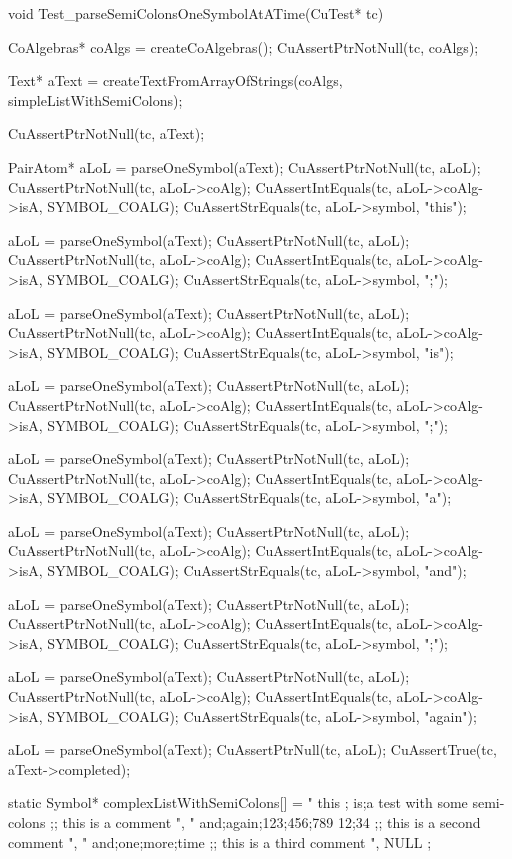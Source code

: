 void Test_parseSemiColonsOneSymbolAtATime(CuTest* tc) {
  CoAlgebras* coAlgs = createCoAlgebras();
  CuAssertPtrNotNull(tc, coAlgs);

  Text* aText =
    createTextFromArrayOfStrings(coAlgs, simpleListWithSemiColons);

  CuAssertPtrNotNull(tc, aText);

  PairAtom* aLoL = parseOneSymbol(aText);
  CuAssertPtrNotNull(tc, aLoL);
  CuAssertPtrNotNull(tc, aLoL->coAlg);
  CuAssertIntEquals(tc, aLoL->coAlg->isA, SYMBOL_COALG);
  CuAssertStrEquals(tc, aLoL->symbol, "this");

  aLoL = parseOneSymbol(aText);
  CuAssertPtrNotNull(tc, aLoL);
  CuAssertPtrNotNull(tc, aLoL->coAlg);
  CuAssertIntEquals(tc, aLoL->coAlg->isA, SYMBOL_COALG);
  CuAssertStrEquals(tc, aLoL->symbol, ";");

  aLoL = parseOneSymbol(aText);
  CuAssertPtrNotNull(tc, aLoL);
  CuAssertPtrNotNull(tc, aLoL->coAlg);
  CuAssertIntEquals(tc, aLoL->coAlg->isA, SYMBOL_COALG);
  CuAssertStrEquals(tc, aLoL->symbol, "is");

  aLoL = parseOneSymbol(aText);
  CuAssertPtrNotNull(tc, aLoL);
  CuAssertPtrNotNull(tc, aLoL->coAlg);
  CuAssertIntEquals(tc, aLoL->coAlg->isA, SYMBOL_COALG);
  CuAssertStrEquals(tc, aLoL->symbol, ";");

  aLoL = parseOneSymbol(aText);
  CuAssertPtrNotNull(tc, aLoL);
  CuAssertPtrNotNull(tc, aLoL->coAlg);
  CuAssertIntEquals(tc, aLoL->coAlg->isA, SYMBOL_COALG);
  CuAssertStrEquals(tc, aLoL->symbol, "a");

  aLoL = parseOneSymbol(aText);
  CuAssertPtrNotNull(tc, aLoL);
  CuAssertPtrNotNull(tc, aLoL->coAlg);
  CuAssertIntEquals(tc, aLoL->coAlg->isA, SYMBOL_COALG);
  CuAssertStrEquals(tc, aLoL->symbol, "and");

  aLoL = parseOneSymbol(aText);
  CuAssertPtrNotNull(tc, aLoL);
  CuAssertPtrNotNull(tc, aLoL->coAlg);
  CuAssertIntEquals(tc, aLoL->coAlg->isA, SYMBOL_COALG);
  CuAssertStrEquals(tc, aLoL->symbol, ";");

  aLoL = parseOneSymbol(aText);
  CuAssertPtrNotNull(tc, aLoL);
  CuAssertPtrNotNull(tc, aLoL->coAlg);
  CuAssertIntEquals(tc, aLoL->coAlg->isA, SYMBOL_COALG);
  CuAssertStrEquals(tc, aLoL->symbol, "again");

  aLoL = parseOneSymbol(aText);
  CuAssertPtrNull(tc, aLoL);
  CuAssertTrue(tc, aText->completed);
}

static Symbol* complexListWithSemiColons[] = {
  " this ; is;a test with some semi-colons ;; this is a comment ",
  " and;again;123;456;789 12;34 ;; this is a second comment ",
  " and;one;more;time ;; this is a third comment ",
  NULL
};

